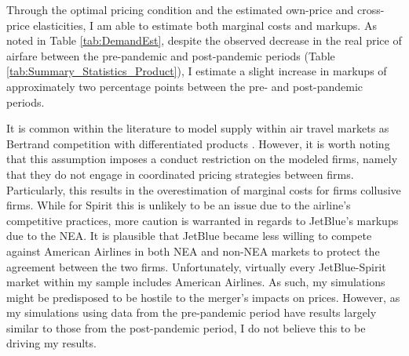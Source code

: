 \documentclass{article}
\begin{document}
    Through the optimal pricing condition and the estimated own-price and cross-price elasticities, I am able to estimate both marginal costs and markups. As noted in Table \ref{tab:DemandEst}, despite the observed decrease in the real price of airfare between the pre-pandemic and post-pandemic periods (Table \ref{tab:Summary_Statistics_Product}), I estimate a slight increase in markups of approximately two percentage points between the pre- and post-pandemic periods.  

    It is common within the literature to model supply within air travel markets as Bertrand competition with differentiated products \citep{ciliberto_market_2021, li_repositioning_2022}. However, it is worth noting that this assumption imposes a conduct restriction on the modeled firms, namely that they do not engage in coordinated pricing strategies between firms. Particularly, this results in the overestimation of marginal costs for firms collusive firms. While for Spirit this is unlikely to be an issue due to the airline's competitive practices, more caution is warranted in regards to JetBlue's markups due to the NEA. It is plausible that JetBlue became less willing to compete against American Airlines in both NEA and non-NEA markets to protect the agreement between the two firms. Unfortunately, virtually every JetBlue-Spirit market within my sample includes American Airlines. As such, my simulations might be predisposed to be hostile to the merger's impacts on prices. However, as my simulations using data from the pre-pandemic period have results largely similar to those from the post-pandemic period, I do not believe this to be driving my results. 
	
\end{document}
